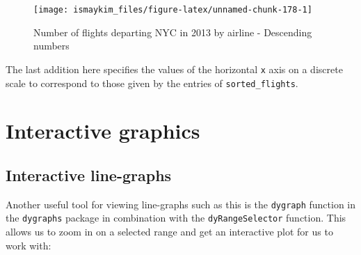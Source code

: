 \documentclass[]{tufte-book}
\newenvironment{Shaded}{\begin{snugshade}}{\end{snugshade}}
\newcommand{\KeywordTok}[1]{\textcolor[rgb]{0.13,0.29,0.53}{\textbf{{#1}}}}
\newcommand{\DataTypeTok}[1]{\textcolor[rgb]{0.13,0.29,0.53}{{#1}}}
\newcommand{\StringTok}[1]{\textcolor[rgb]{0.31,0.60,0.02}{{#1}}}
\newcommand{\OtherTok}[1]{\textcolor[rgb]{0.56,0.35,0.01}{{#1}}}
\newcommand{\NormalTok}[1]{{#1}}
\begin{document}
\begin{figure}

{\centering \texttt{[image: ismaykim\_files/figure-latex/unnamed-chunk-178-1]} 

}

\caption[Number of flights departing NYC in 2013 by airline - Descending numbers]{Number of flights departing NYC in 2013 by airline - Descending numbers}\label{fig:unnamed-chunk-178}
\end{figure}

The last addition here specifies the values of the horizontal \texttt{x}
axis on a discrete scale to correspond to those given by the entries of
\texttt{sorted\_flights}.

\section{Interactive graphics}\label{interactive-graphics}

\subsection{Interactive line-graphs}\label{interactive-line-graphs}

Another useful tool for viewing line-graphs such as this is the
\texttt{dygraph} function in the \texttt{dygraphs} package in
combination with the \texttt{dyRangeSelector} function. This allows us
to zoom in on a selected range and get an interactive plot for us to
work with:

\begin{Shaded}
\end{Shaded}
\end{document}
